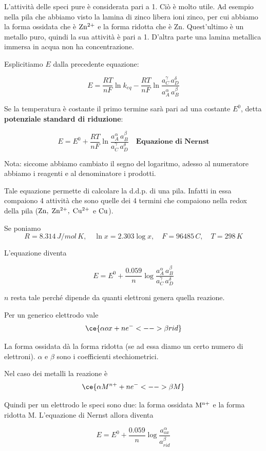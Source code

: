 L'attività delle speci pure è considerata pari a 1. Ciò è molto utile. Ad esempio nella pila che abbiamo visto la lamina di zinco libera ioni zinco, per cui abbiamo la forma ossidata che è $\rm Zn^{2+}$ e la forma ridotta che è Zn. Quest'ultimo è un metallo puro, quindi la sua attività è pari a 1. D'altra parte una lamina metallica immersa in acqua non ha concentrazione.

Esplicitiamo $E$ dalla precedente equazione:

$$E=\frac{RT}{nF}\ln k_{eq} - \frac{RT}{nF}\ln \frac{a_C^{\gamma} \, a_D^{\delta}}{a_A^{\alpha} \, a_B^{\beta}}$$

Se la temperatura è costante il primo termine sarà pari ad una costante $E^0$, detta \textbf{potenziale standard di riduzione}:

$$E= E^0 + \frac{RT}{nF}\ln \frac{a_A^{\alpha} \, a_B^{\beta}}{a_C^{\gamma} \, a_D^{\delta}} \quad \textbf{Equazione di Nernst}$$

Nota: siccome abbiamo cambiato il segno del logaritmo, adesso al numeratore abbiamo i reagenti e al denominatore i prodotti.

Tale equazione permette di calcolare la d.d.p. di una pila. Infatti in essa compaiono 4 attività che sono quelle dei 4 termini che compaiono nella redox della pila ($\rm Zn, \; Zn^{2+}, \; Cu^{2+}$ e $\rm Cu$).

Se poniamo
$$R=8.314 \, J/mol\,K, \quad \ln x = 2.303 \log x, \quad F=96485 \, C, \quad T=298 \,K$$

L'equazione diventa

$$E = E^0 + \frac{0.059}{n}\log \frac{a_A^{\alpha} \, a_B^{\beta}}{a_C^{\gamma} \, a_D^{\delta}}$$

$n$ resta tale perché dipende da quanti elettroni genera quella reazione.

\vspace{0.2cm}Per un generico elettrodo vale
$$\ce{\alpha ox + ne^- <--> \beta rid}$$

La forma ossidata dà la forma ridotta (se ad essa diamo un certo numero di elettroni). $\alpha$ e $\beta$ sono i coefficienti stechiometrici.

Nel caso dei metalli la reazione è
$$\ce{\alpha M^{n+} + ne^- <--> \beta M}$$

Quindi per un elettrodo le speci sono due: la forma ossidata $\rm M^{n+}$ e la forma ridotta M. L'equazione di Nernst allora diventa

$$E = E^0 + \frac{0.059}{n}\log \frac{a_{ox}^{\alpha}}{a_{rid}^{\beta}}$$

